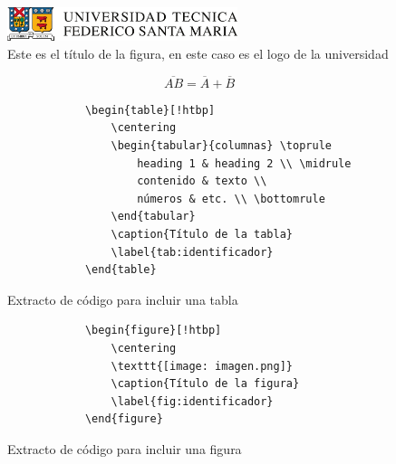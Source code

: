 \documentclass[a4paper]{article}
\begin{document}
\begin{figure}[!htbp]
    \centering %
    \includegraphics[width=0.6\textwidth]{logo_usm.png} %
    \caption{Este es el título de la figura, en este caso es el logo de la universidad}
    \label{fig:ej_figura} %
\end{figure}

\begin{equation}
    \overline{A B} = \overline{A} + \overline{B}
    \label{eq:ej_ecuacion} %
\end{equation}

\begin{figure}[!htbp]
    \centering
    \begin{minipage}{0.7\textwidth}
        \begin{verbatim}
            \begin{table}[!htbp]
                \centering
                \begin{tabular}{columnas} \toprule
                    heading 1 & heading 2 \\ \midrule
                    contenido & texto \\
                    números & etc. \\ \bottomrule
                \end{tabular}
                \caption{Título de la tabla}
                \label{tab:identificador}
            \end{table}
        \end{verbatim}
    \end{minipage}
    \caption{Extracto de código para incluir una tabla}
    \label{fig:v_tabla}
\end{figure}

\begin{figure}[!htbp]
    \centering
    \begin{minipage}{0.7\textwidth}
        \begin{verbatim}
            \begin{figure}[!htbp]
                \centering
                \texttt{[image: imagen.png]}
                \caption{Título de la figura}
                \label{fig:identificador}
            \end{figure}
        \end{verbatim}
    \end{minipage}
    \caption{Extracto de código para incluir una figura}
    \label{fig:v_figura}
\end{figure}
\end{document}
